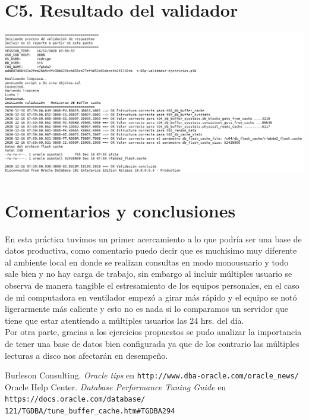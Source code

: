 \documentclass{article}
\begin{document}
\section*{C5. Resultado del validador}

\includegraphics[width=\linewidth]{validador}

\section*{Comentarios y conclusiones}

En esta práctica tuvimos un primer acercamiento a lo que podría ser una base
de datos productiva, como comentario puedo decir que es muchísimo muy diferente
al ambiente local en donde se realizan consultas en modo monousuario y todo
sale bien y no hay carga de trabajo, sin embargo al incluir múltiples usuario
se observa de manera tangible el estresamiento de los equipos personales, en 
el caso de mi computadora en ventilador empezó a girar más rápido y el equipo
se notó ligerarmente más caliente y esto no es nada si lo comparamos un 
servidor que tiene que estar atentiendo a múltiples usuarios las 24 hrs. del 
día. \\

Por otra parte, gracias a los ejercicios propuestos se pudo analizar la 
importancia de tener una base de datos bien configurada ya que de los contrario
las múltiples lecturas a disco nos afectarán en desempeño.

\renewcommand\refname{Bibliografía y referencias}
\begin{thebibliography}{99}
     Burleson Consulting. \textit{Oracle tips } en 
    \texttt{http://www.dba-oracle.com/oracle\_news/}
   Oracle Help Center. \textit{Database Performance Tuning 
    Guide} en \texttt{https://docs.oracle.com/database/\\%
    121/TGDBA/tune\_buffer\_cache.htm\#TGDBA294}
\end{thebibliography}
\end{document}
